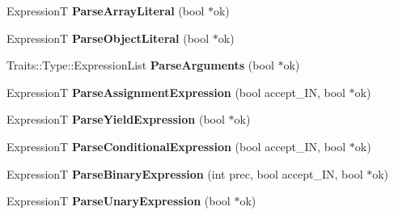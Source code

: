 \begin{DoxyCompactItemize}
\item 
\hypertarget{classv8_1_1internal_1_1_parser_base_aa1408f010487694c51a179e0d1ccc668}{}Expression\+T {\bfseries Parse\+Array\+Literal} (bool $\ast$ok)\label{classv8_1_1internal_1_1_parser_base_aa1408f010487694c51a179e0d1ccc668}

\item 
\hypertarget{classv8_1_1internal_1_1_parser_base_a2b1808718c9019ffac0789daefa27ae9}{}Expression\+T {\bfseries Parse\+Object\+Literal} (bool $\ast$ok)\label{classv8_1_1internal_1_1_parser_base_a2b1808718c9019ffac0789daefa27ae9}

\item 
\hypertarget{classv8_1_1internal_1_1_parser_base_a71b5ae659c41e3addfe01adeef020f7d}{}Traits\+::\+Type\+::\+Expression\+List {\bfseries Parse\+Arguments} (bool $\ast$ok)\label{classv8_1_1internal_1_1_parser_base_a71b5ae659c41e3addfe01adeef020f7d}

\item 
\hypertarget{classv8_1_1internal_1_1_parser_base_aa60094da04ef150aa1fc22d53d931623}{}Expression\+T {\bfseries Parse\+Assignment\+Expression} (bool accept\+\_\+\+I\+N, bool $\ast$ok)\label{classv8_1_1internal_1_1_parser_base_aa60094da04ef150aa1fc22d53d931623}

\item 
\hypertarget{classv8_1_1internal_1_1_parser_base_a5f100024de9d82feec3ab7871e9a7057}{}Expression\+T {\bfseries Parse\+Yield\+Expression} (bool $\ast$ok)\label{classv8_1_1internal_1_1_parser_base_a5f100024de9d82feec3ab7871e9a7057}

\item 
\hypertarget{classv8_1_1internal_1_1_parser_base_a2dc50acd4fecf795ab0fac862a1d22cc}{}Expression\+T {\bfseries Parse\+Conditional\+Expression} (bool accept\+\_\+\+I\+N, bool $\ast$ok)\label{classv8_1_1internal_1_1_parser_base_a2dc50acd4fecf795ab0fac862a1d22cc}

\item 
\hypertarget{classv8_1_1internal_1_1_parser_base_a0929bb95f837ecfc0d87bcfda8e7d29e}{}Expression\+T {\bfseries Parse\+Binary\+Expression} (int prec, bool accept\+\_\+\+I\+N, bool $\ast$ok)\label{classv8_1_1internal_1_1_parser_base_a0929bb95f837ecfc0d87bcfda8e7d29e}

\item 
\hypertarget{classv8_1_1internal_1_1_parser_base_acb49c26162185c6d328efcf464416957}{}Expression\+T {\bfseries Parse\+Unary\+Expression} (bool $\ast$ok)\label{classv8_1_1internal_1_1_parser_base_acb49c26162185c6d328efcf464416957}


\end{DoxyCompactItemize}
